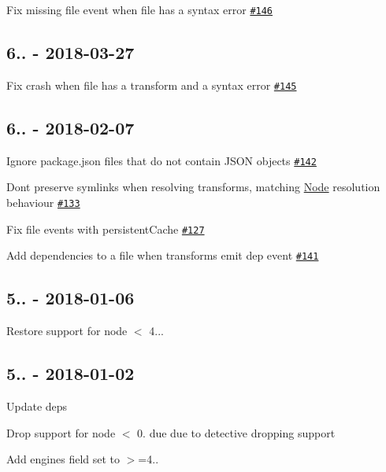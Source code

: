 \begin{DoxyItemize}
\item Fix missing \textquotesingle{}file\textquotesingle{} event when file has a syntax error \href{https://github.com/browserify/module-deps/pull/146}{\tt \#146}
\end{DoxyItemize}

\subsection*{6.. -\/ 2018-\/03-\/27}


\begin{DoxyItemize}
\item Fix crash when file has a transform and a syntax error \href{https://github.com/browserify/module-deps/pull/145}{\tt \#145}
\end{DoxyItemize}

\subsection*{6.. -\/ 2018-\/02-\/07}


\begin{DoxyItemize}
\item Ignore package.\+json files that do not contain J\+S\+ON objects \href{https://github.com/browserify/module-deps/pull/142}{\tt \#142}
\item Don\textquotesingle{}t preserve symlinks when resolving transforms, matching \mbox{\hyperlink{classNode}{Node}} resolution behaviour \href{https://github.com/browserify/module-deps/pull/133}{\tt \#133}
\item Fix \textquotesingle{}file\textquotesingle{} events with {\ttfamily persistent\+Cache} \href{https://github.com/browserify/module-deps/pull/127}{\tt \#127}
\item Add dependencies to a file when transforms emit \textquotesingle{}dep\textquotesingle{} event \href{https://github.com/browserify/module-deps/pull/141}{\tt \#141}
\end{DoxyItemize}

\subsection*{5.. -\/ 2018-\/01-\/06}


\begin{DoxyItemize}
\item Restore support for node $<$ 4...
\end{DoxyItemize}

\subsection*{5.. -\/ 2018-\/01-\/02}


\begin{DoxyItemize}
\item Update deps
\item Drop support for node $<$ 0. due due to detective dropping support
\item Add engines field set to {\ttfamily $>$=4..} 
\end{DoxyItemize}
